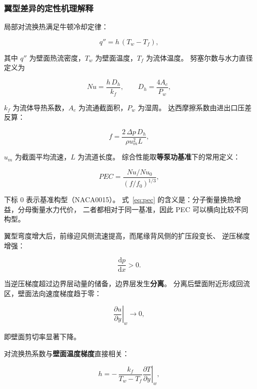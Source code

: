 \documentclass[stage2,fontset=fandol]{ydzjreport}
\begin{document}
\subsubsection{翼型差异的定性机理解释}

局部对流换热满足牛顿冷却定律：

\begin{equation}
q'' = h\,(T_w - T_f),
\label{eq:newton}
\end{equation}

其中 $q''$ 为壁面热流密度，$T_w$ 为壁面温度，$T_f$ 为流体温度。
努塞尔数与水力直径定义为

\begin{equation}
Nu = \frac{h\,D_h}{k_f},\qquad D_h = \frac{4A_c}{P_w},
\label{eq:nu}
\end{equation}

$k_f$ 为流体导热系数，$A_c$ 为流通截面积，$P_w$ 为湿周。
达西摩擦系数由进出口压差反算：

\begin{equation}
f = \frac{2\,\Delta p\,D_h}{\rho u_m^2 L},
\label{eq:friction}
\end{equation}

$u_m$ 为截面平均流速，$L$ 为流道长度。
综合性能取\textbf{等泵功基准}下的常用定义：

\begin{equation}
PEC = \frac{Nu/Nu_0}{\left(f/f_0\right)^{1/3}},
\label{eq:pec}
\end{equation}

下标 0 表示基准构型（NACA0015）。
式~\eqref{eq:pec} 的含义是：分子衡量换热增益，分母衡量水力代价，
二者都相对于同一基准，因此 PEC 可以横向比较不同构型。

翼型弯度增大后，前缘迎风侧流速提高，而尾缘背风侧的扩压段变长、
逆压梯度增强：

\begin{equation}
\frac{\mathrm{d}p}{\mathrm{d}x} > 0 .
\label{eq:adverse}
\end{equation}

当逆压梯度超过边界层动量的储备，边界层发生\textbf{分离}。
分离后壁面附近形成回流区，壁面法向速度梯度趋于零：

\begin{equation}
\left.\frac{\partial u}{\partial y}\right|_{w} \rightarrow 0 ,
\label{eq:shear}
\end{equation}

即壁面剪切率显著下降。

对流换热系数与\textbf{壁面温度梯度}直接相关：

\begin{equation}
h = -\,\frac{k_f}{T_w - T_f}\left.\frac{\partial T}{\partial y}\right|_{w},
\label{eq:hgrad}
\end{equation}
\end{document}
